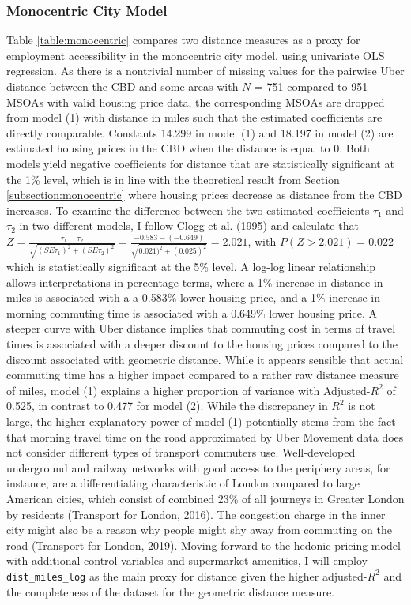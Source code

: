 \documentclass{article}
\begin{document}
\subsubsection{Monocentric City Model}
Table \ref{table:monocentric} compares two distance measures as a proxy for employment accessibility in the monocentric city model, using univariate OLS regression. As there is a nontrivial number of missing values for the pairwise Uber distance between the CBD and some areas with $N$ = 751 compared to 951 MSOAs with valid housing price data, the corresponding MSOAs are dropped from model (1) with distance in miles such that the estimated coefficients are directly comparable. Constants 14.299 in model (1) and 18.197 in model (2) are estimated housing prices in the CBD when the distance is equal to 0. Both models yield negative coefficients for distance that are statistically significant at the 1\% level, which is in line with the theoretical result from Section \ref{subsection:monocentric} where housing prices decrease as distance from the CBD increases. To examine the difference between the two estimated coefficients $\tau_1$ and $\tau_2$ in two different models, I follow Clogg et al. (1995) and calculate that $Z = \frac{\tau_1 - \tau_2}{\sqrt{(SE\tau_1)^2 + (SE\tau_2)^2}}  = \frac{-0.583 - (-0.649)}{\sqrt{0.021)^2 + (0.025)^2}} = 2.021$, with $P(Z > 2.021) = 0.022$  which is statistically significant at the 5\% level. A log-log linear relationship allows interpretations in percentage terms, where a 1\% increase in distance in miles is associated with a a 0.583\% lower housing price, and a 1\% increase in morning commuting time is associated with a 0.649\% lower housing price.  A steeper curve with Uber distance implies that commuting cost in terms of travel times is associated with a deeper discount to the housing prices compared to the discount associated with geometric distance. While it appears sensible that actual commuting time has a higher impact compared to a rather raw distance measure of miles, model (1) explains a higher proportion of variance with Adjusted-$R^2$ of 0.525, in contrast to 0.477 for model (2). While the discrepancy in $R^2$ is not large, the higher explanatory power of model (1) potentially stems from the fact that morning travel time on the road approximated by Uber Movement data does not consider different types of transport commuters use. Well-developed underground and railway networks with good access to the periphery areas, for instance, are a differentiating characteristic of London compared to large American cities, which consist of combined 23\% of all journeys in Greater London by residents (Transport for London, 2016). The congestion charge in the inner city might also be a reason why people might shy away from commuting on the road (Transport for London, 2019). Moving forward to the hedonic pricing model with additional control variables and supermarket amenities, I will employ \texttt{dist\_miles\_log} as the main proxy for distance given the higher adjusted-$R^2$ and the completeness of the dataset for the geometric distance measure.
\end{document}
